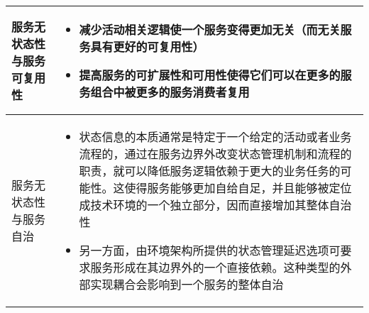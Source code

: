\begin{longtable}{|m{3cm}<{\centering}|m{12cm}|}
    \hline
    服务无状态性与服务可复用性
    & 
    \vspace{-1.3em}
    \begin{itemize}[leftmargin=1.5em,itemsep=-3pt,topsep=-3pt]
        \item 减少活动相关逻辑使一个服务变得更加无关（而无关服务具有更好的可复用性）
        \item 提高服务的可扩展性和可用性使得它们可以在更多的服务组合中被更多的服务消费者复用
    \vspace{-1.5em}
    \end{itemize}  
    \\ \hline
    服务无状态性与服务自治
    & 
    \vspace{-1.3em}
    \begin{itemize}[leftmargin=1.5em,itemsep=-3pt,topsep=-3pt]
        \item 状态信息的本质通常是特定于一个给定的活动或者业务流程的，通过在服务边界外改变状态管理机制和流程的职责，就可以降低服务逻辑依赖于更大的业务任务的可能性。这使得服务能够更加自给自足，并且能够被定位成技术环境的一个独立部分，因而直接增加其整体自治性
        \item 另一方面，由环境架构所提供的状态管理延迟选项可要求服务形成在其边界外的一个直接依赖。这种类型的外部实现耦合会影响到一个服务的整体自治
    \vspace{-1.5em}
    \end{itemize}  
    \\ \hline
\end{longtable}
